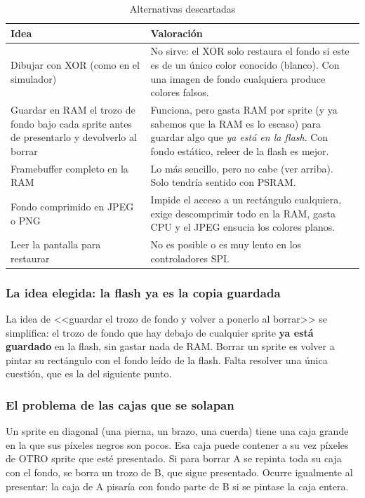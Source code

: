 \begin{table}[H]
	\centering
	\begin{tabular}{p{4.2cm}p{9cm}}
		\toprule
		Idea & Valoración \\
		\midrule
		Dibujar con XOR (como en el simulador) & No sirve: el XOR solo restaura el fondo si este es de un único color conocido (blanco). Con una imagen de fondo cualquiera produce colores falsos. \\
		Guardar en RAM el trozo de fondo bajo cada sprite antes de presentarlo y devolverlo al borrar & Funciona, pero gasta RAM por sprite (y ya sabemos que la RAM es lo escaso) para guardar algo que \emph{ya está en la flash}. Con fondo estático, releer de la flash es mejor. \\
		Framebuffer completo en la RAM & Lo más sencillo, pero no cabe (ver arriba). Solo tendría sentido con PSRAM. \\
		Fondo comprimido en JPEG o PNG & Impide el acceso a un rectángulo cualquiera, exige descomprimir todo en la RAM, gasta CPU y el JPEG ensucia los colores planos. \\
		Leer la pantalla para restaurar & No es posible o es muy lento en los controladores SPI. \\
		\bottomrule
	\end{tabular}
	\caption{Alternativas descartadas}
	\label{tab:F6I91Descartadas}
\end{table}

\subsubsection{La idea elegida: la flash ya es la copia guardada}

La idea de <<guardar el trozo de fondo y volver a ponerlo al borrar>> se simplifica: el trozo de fondo que hay debajo de cualquier sprite \textbf{ya está guardado} en la flash, sin gastar nada de RAM. Borrar un sprite es volver a pintar su rectángulo con el fondo leído de la flash. Falta resolver una única cuestión, que es la del siguiente punto.

\subsubsection{El problema de las cajas que se solapan}

Un sprite en diagonal (una pierna, un brazo, una cuerda) tiene una caja grande en la que sus píxeles negros son pocos. Esa caja puede contener a su vez píxeles de OTRO sprite que esté presentado. Si para borrar A se repinta toda su caja con el fondo, se borra un trozo de B, que sigue presentado. Ocurre igualmente al presentar: la caja de A pisaría con fondo parte de B si se pintase la caja entera.

